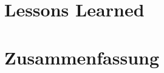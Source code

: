 \documentclass[12pt,ngerman,seminar]{dbvstudentwork}
\begin{document}
	\section{Lessons Learned}
	\label{sec:lessonslearned}
		
		
	\section{Zusammenfassung}
	\label{sec:summary}
		
	
	
	\singlespacing
	
	\clearpage
	
	\clearpage
	\listoffigures %
	\clearpage
	
\end{document}
